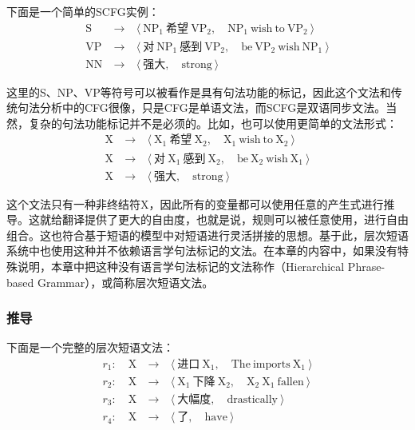 \parinterval 下面是一个简单的SCFG实例：
\begin{eqnarray}
\textrm{S}\ &\to\ &\langle \ \textrm{NP}_1\ \text{希望}\ \textrm{VP}_2,\quad \textrm{NP}_1\ \textrm{wish}\ \textrm{to}\ \textrm{VP}_2\ \rangle \nonumber \\
\textrm{VP}\ &\to\ &\langle \ \text{对}\ \textrm{NP}_1\ \text{感到}\ \textrm{VP}_2,\quad \textrm{be}\ \textrm{VP}_2\ \textrm{wish}\ \textrm{NP}_1\ \rangle \nonumber \\
\textrm{NN}\ &\to\ &\langle \ \text{强大},\quad \textrm{strong}\ \rangle \nonumber
\end{eqnarray}

\parinterval 这里的S、NP、VP等符号可以被看作是具有句法功能的标记，因此这个文法和传统句法分析中的CFG很像，只是CFG是单语文法，而SCFG是双语同步文法。当然，复杂的句法功能标记并不是必须的。比如，也可以使用更简单的文法形式：
\begin{eqnarray}
\textrm{X}\ &\to\ &\langle \ \textrm{X}_1\ \text{希望}\ \textrm{X}_2,\quad \textrm{X}_1\ \textrm{wish}\ \textrm{to}\ \textrm{X}_2\ \rangle \nonumber \\
\textrm{X}\ &\to\ &\langle \ \text{对}\ \textrm{X}_1\ \text{感到}\ \textrm{X}_2,\quad \textrm{be}\ \textrm{X}_2\ \textrm{wish}\ \textrm{X}_1\ \rangle \nonumber \\
\textrm{X}\ &\to\ &\langle \ \text{强大},\quad \textrm{strong}\ \rangle \nonumber
\end{eqnarray}

\parinterval 这个文法只有一种非终结符X，因此所有的变量都可以使用任意的产生式进行推导。这就给翻译提供了更大的自由度，也就是说，规则可以被任意使用，进行自由组合。这也符合基于短语的模型中对短语进行灵活拼接的思想。基于此，层次短语系统中也使用这种并不依赖语言学句法标记的文法。在本章的内容中，如果没有特殊说明，本章中把这种没有语言学句法标记的文法称作{\small{}}（Hierarchical Phrase-based Grammar），或简称层次短语文法。


\subsubsection{推导}

\parinterval 下面是一个完整的层次短语文法：
\begin{eqnarray}
r_1:\quad \textrm{X}\ &\to\ &\langle \ \text{进口}\ \textrm{X}_1,\quad \textrm{The}\ \textrm{imports}\ \textrm{X}_1\ \rangle \nonumber \\
r_2:\quad \textrm{X}\ &\to\ &\langle \ \textrm{X}_1\ \text{下降}\ \textrm{X}_2,\quad \textrm{X}_2\ \textrm{X}_1\ \textrm{fallen}\ \rangle \nonumber \\
r_3:\quad \textrm{X}\ &\to\ &\langle \ \text{大幅度},\quad \textrm{drastically}\ \rangle \nonumber \\
r_4:\quad \textrm{X}\ &\to\ &\langle \ \text{了},\quad \textrm{have}\ \rangle \nonumber
\end{eqnarray}

